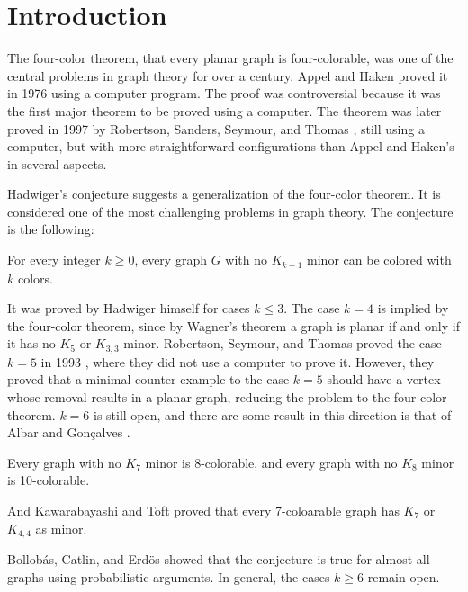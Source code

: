 \chapter*{Introduction}

The four-color theorem, that every planar graph is four-colorable, was one of the central problems
in graph theory for over a century. Appel and Haken proved it in 1976 \cite{appel_haken_1977} using a computer program.
The proof was controversial because it was the first major theorem to be proved using a computer.
The theorem was later proved in 1997 by Robertson, Sanders, Seymour, and Thomas \cite{ROBERTSON19972},
still using a computer, but with more straightforward configurations than Appel and Haken's in several aspects. 

Hadwiger's conjecture \cite{hadwiger_1943} suggests a generalization of the four-color theorem. It is considered one of 
the most challenging problems in graph theory. The conjecture is the following: 


\begin{conj} 
 For every integer $k \geq 0$, every graph $G$ with no $K_{k+1}$ minor can be colored with $k$ colors.
\end{conj}

It was proved by Hadwiger himself for cases $k \leq 3$. The case $k = 4$ is implied by the four-color theorem, since by Wagner's theorem \cite{wagner_1937} a graph is planar if and only if
it has no $K_5$ or $K_{3,3}$ minor. Robertson, Seymour, and Thomas proved the case $k = 5$ in 1993 \cite{robertson_seymour_1993}, 
where they did not use a computer to prove it. However, they proved that a minimal counter-example to the case $k = 5$ should have 
a vertex whose removal results in a planar graph, reducing the problem to the four-color theorem. $k = 6$ is still open, and there are some result in this direction is that of Albar and Gonçalves \cite{albar_goncalves_2013}. 
\begin{thm}
 Every graph with no $K_7$ minor is 8-colorable, and every graph with no $K_8$ minor is 10-colorable.
\end{thm}

And Kawarabayashi and Toft \cite{Kawarabayashi2005} proved that every 7-coloarable graph has $K_7$ or $K_{4,4}$ as minor.

Bollobás, Catlin, and Erdös \cite{BOLLOBAS1980195} showed that the conjecture is true for almost all graphs using
probabilistic arguments. In general, the cases $k \geq 6$ remain open.

